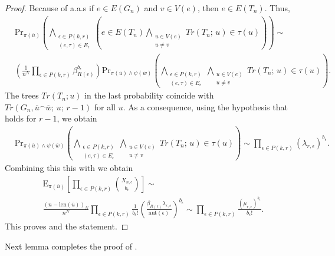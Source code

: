 \documentclass[12pt,notitlepage,a4paper]{article}
\theoremstyle{definition}
\newcommand{\aut}{\mathrm{aut}}
\newcommand{\len}{\mathrm{len}}
\begin{document}
\begin{proof}
	Because of  a.a.s if $e\in E(G_n)$
	and $v\in V(e)$, then $e\in E(T_n)$. Thus,
	\begin{align} \label{eqn:aux4}
	&\mathrm{Pr}_{\pi(\overline{u})}\left(
	\bigwedge_{\substack{
			\epsilon\in P(k,r)\\
			(e, \tau)\in E_{\epsilon}
	}} \left(
	e\in E(T_n) \bigwedge_{\substack{
			u\in V(e)\\
			u\neq v}} Tr(T_n;\, u)
	\in \tau(u)		
	\right)
	\right)\sim \\ \nonumber
	&
	\left(\frac{1}{n^N}
	\prod_{\epsilon\in
	P(k,r)} \beta_{R(\epsilon)}^{b_\epsilon}\right)
	\mathrm{Pr}_{\pi(\overline{u})\wedge \psi(\overline{w})}\left(
	\bigwedge_{\substack{
			\epsilon\in P(k,r)\\
			(e, \tau)\in E_{\epsilon}
	}} 
	\bigwedge_{\substack{
		u\in V(e)\\
		u\neq v
	}}Tr(T_n;\, u)\in \tau(u)	
	\right).
	\end{align}
	The trees $Tr(T_n;u)$ in the last probability
	coincide with 
	$Tr(G_n,\overline{u}^\smallfrown\overline{w};\,u;\, r-1)$
	for all $u$.
	As a consequence, using the hypothesis that 
	holds for $r-1$, we obtain
	\begin{align*}
	&	\mathrm{Pr}_{\pi(\overline{u})\wedge \psi(\overline{w})}
	\left(
	\bigwedge_{\substack{
			\epsilon\in P(k,r)\\
			(e, \tau)\in E_{\epsilon}
	}} 
	\bigwedge_{\substack{
			u\in V(e)\\
			u\neq v
	}}Tr(T_n;\, u)\in \tau(u)	
	\right) \sim
	 \prod_{\epsilon\in P(k,r)} (\lambda_{r,\epsilon})^{b_\epsilon}.
	\end{align*}
	Combining this this with  we obtain 
	\begin{align*} 
	\mathrm{E}_{\pi(\overline{u})}
	\left[
	\prod_{\epsilon\in P(k,r)} \binom{X_{n,\epsilon}}{b_\epsilon}	
	\right]
	\sim   \\
	\frac{(n-\len(\overline{u}))_{N}}
	{n^{N}}
	\prod_{\epsilon\in P(k,r)}
	\frac{1}{b_\epsilon!}  
	\left( \frac{\beta_{R(\epsilon)}  \lambda_{r,\epsilon}
	}{\aut(\epsilon)} \right)^
	{b_\epsilon} \sim \prod_{\epsilon\in P(k,r)}
	\frac{\left( \mu_{r,\epsilon} \right)^
		{b_\epsilon}}{b_\epsilon!}.
	\end{align*}
	This proves  and the statement. 	
\end{proof}

Next lemma completes the proof of .
\end{document}
